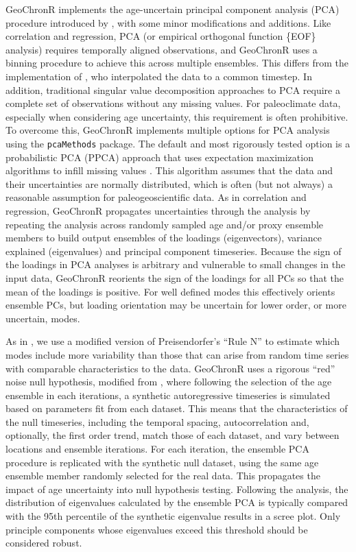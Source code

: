 \documentclass[gchron, manuscript]{copernicus}
\begin{document}
GeoChronR implements the age-uncertain principal component analysis (PCA) procedure introduced by \citet{anchukaitis2013mceof}, with some minor modifications and additions.
Like correlation and regression, PCA (or empirical orthogonal function \{EOF\} analysis) requires temporally aligned observations, and GeoChronR uses a binning procedure to achieve this across multiple ensembles.
This differs from the implementation of \citet{anchukaitis2013mceof}, who interpolated the data to a common timestep.
In addition, traditional singular value decomposition approaches to PCA require a complete set of observations without any missing values.
For paleoclimate data, especially when considering age uncertainty, this requirement is often prohibitive.
To overcome this, GeoChronR implements multiple options for PCA analysis using the \texttt{pcaMethods} package.
The default and most rigorously tested option is a probabilistic PCA (PPCA) approach that uses expectation maximization algorithms to infill missing values \citep{roweis1998algorithms}.
This algorithm assumes that the data and their uncertainties are normally distributed, which is often (but not always) a reasonable assumption for paleogeoscientific data.
As in correlation and regression, GeoChronR propagates uncertainties through the analysis by repeating the analysis across randomly sampled age and/or proxy ensemble members to build output ensembles of the loadings (eigenvectors), variance explained (eigenvalues) and principal component timeseries.
Because the sign of the loadings in PCA analyses is arbitrary and vulnerable to small changes in the input data, GeoChronR reorients the sign of the loadings for all PCs so that the mean of the loadings is positive.
For well defined modes this effectively orients ensemble PCs, but loading orientation may be uncertain for lower order, or more uncertain, modes.

As in \citet{anchukaitis2013mceof}, we use a modified version of Preisendorfer's ``Rule N'' \citep{PreisendorferMobley1988} to estimate which modes include more variability than those that can arise from random time series with comparable characteristics to the data.
GeoChronR uses a rigorous ``red'' noise null hypothesis, modified from \citet{SchneiderNeumaier2001}, where following the selection of the age ensemble in each iterations, a synthetic autoregressive timeseries is simulated based on parameters fit from each dataset.
This means that the characteristics of the null timeseries, including the temporal spacing, autocorrelation and, optionally, the first order trend, match those of each dataset, and vary between locations and ensemble iterations.
For each iteration, the ensemble PCA procedure is replicated with the synthetic null dataset, using the same age ensemble member randomly selected for the real data.
This propagates the impact of age uncertainty into null hypothesis testing.
Following the analysis, the distribution of eigenvalues calculated by the ensemble PCA is typically compared with the 95th percentile of the synthetic eigenvalue results in a scree plot.
Only principle components whose eigenvalues exceed this threshold should be considered robust.
\end{document}
